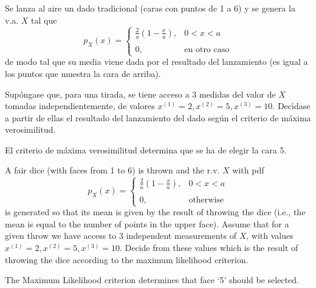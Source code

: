 \ifspanish

\question Se lanza al aire un dado tradicional (caras con puntos de 1 a 6) y se genera la v.a. $X$ tal que
$$p_X(x) = \left\{\begin{array}{ll}
					\displaystyle
					\frac{2}{a} \left(1-\frac{x}{a}\right), & 0<x<a\\
					\\
					0, & {\mbox{en otro caso}}  
	 			  \end{array} 
           \right. $$
de modo tal que su media viene dada por el resultado del lanzamiento (es igual a los puntos que muestra la cara de arriba).

Sup\'{o}ngase que, para una tirada, se tiene acceso a 3 medidas del valor de $X$ tomadas independientemente, de valores $x^{(1)} = 2, x^{(2)} = 5, x^{(3)} = 10$. Dec\'{\i}dase a partir de ellas el resultado del lanzamiento del dado seg\'{u}n el criterio de m\'{a}xima verosimilitud.

\begin{solution}
El criterio de m\'{a}xima verosimilitud determina que se ha de elegir la cara 5.
\end{solution}

\else

\question A fair dice (with faces from 1 to 6) is thrown and the r.v. $X$ with pdf 
$$p_X(x) = \left\{\begin{array}{ll}
						  	\displaystyle
								  \frac{2}{a} \left(1-\frac{x}{a}\right), & 0<x<a\\
								  \\
								  0, & {\mbox{otherwise}}  
	 					 \end{array} 
						  \right.						  
				      $$
is generated so that its mean is given by the result of throwing the dice (i.e., the mean is equal to the number of points in the upper face).
Assume that for a given throw we have access to 3 independent measurements of $X$, with values $x^{(1)} = 2, x^{(2)} = 5, x^{(3)} = 10$.
Decide from these values which is the result of throwing the dice according to the maximum likelihood criterion. 


\begin{solution}
The Maximum Likelihood criterion determines that face `5' should be selected.
\end{solution}

\fi